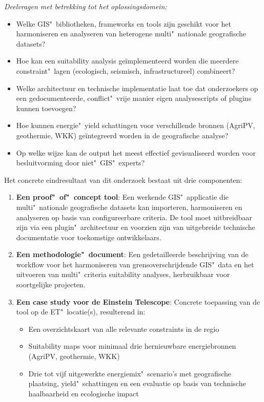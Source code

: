 \textit{Deelvragen met betrekking tot het oplossingsdomein:}
\begin{itemize}
    \item Welke GIS"~bibliotheken, frameworks en tools zijn geschikt voor het harmoniseren en analyseren van heterogene multi"~nationale geografische datasets?
    \item Hoe kan een suitability analysis geïmplementeerd worden die meerdere constraint"~lagen (ecologisch, seismisch, infrastructureel) combineert?
    \item Welke architectuur en technische implementatie laat toe dat onderzoekers op een gedocumenteerde, conflict"~vrije manier eigen analysescripts of plugins kunnen toevoegen?
    \item Hoe kunnen energie"~yield schattingen voor verschillende bronnen (AgriPV, geothermie, WKK) geïntegreerd worden in de geografische analyse?
    \item Op welke wijze kan de output het meest effectief gevisualiseerd worden voor besluitvorming door niet"~GIS"~experts?
\end{itemize}

Het concrete eindresultaat van dit onderzoek bestaat uit drie componenten:

\begin{enumerate}
    \item \textbf{Een proof"~of"~concept tool}: Een werkende GIS"~applicatie die multi"~nationale geografische datasets kan importeren, harmoniseren en analyseren op basis van configureerbare criteria. De tool moet uitbreidbaar zijn via een plugin"~architectuur en voorzien zijn van uitgebreide technische documentatie voor toekomstige ontwikkelaars.
    
    \item \textbf{Een methodologie"~document}: Een gedetailleerde beschrijving van de workflow voor het harmoniseren van grensoverschrijdende GIS"~data en het uitvoeren van multi"~criteria suitability analyses, herbruikbaar voor soortgelijke projecten.
    
    \item \textbf{Een case study voor de Einstein Telescope}: Concrete toepassing van de tool op de ET"~locatie(s), resulterend in:
    \begin{itemize}
        \item Een overzichtskaart van alle relevante constraints in de regio
        \item Suitability maps voor minimaal drie hernieuwbare energiebronnen (AgriPV, geothermie, WKK)
        \item Drie tot vijf uitgewerkte energiemix"~scenario's met geografische plaatsing, yield"~schattingen en een evaluatie op basis van technische haalbaarheid en ecologische impact
    \end{itemize}
\end{enumerate}

